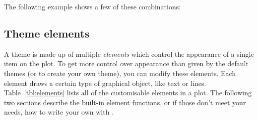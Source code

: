 \noindent The following example shows a few of these combinations:

% 
% 
% 
% 
% 


\subsection{Theme elements}
\label{sec:theme_elements}

A theme is made up of multiple \emph{elements} which control the appearance of a single item on the plot.  To get more control over appearance than given by the default themes (or to create your own theme), you can modify these elements.  Each element draws a certain type of graphical object, like text or lines. Table~\ref{tbl:elements} lists all of the customisable elements in a plot. The following two sections describe the built-in element functions, or if those don't meet your needs, how to write your own with .



